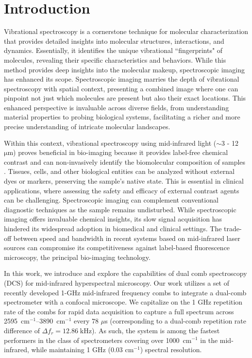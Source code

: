\documentclass[aip,preprint]{revtex4-1}
\begin{document}


\section{Introduction}
Vibrational spectroscopy is a cornerstone technique for molecular characterization that provides detailed insights into molecular structures, interactions, and dynamics. Essentially, it identifies the unique vibrational ``fingerprints" of molecules, revealing their specific characteristics and behaviors. While this method provides deep insights into the molecular makeup, spectroscopic imaging has enhanced its scope. Spectroscopic imaging marries the depth of vibrational spectroscopy with spatial context, presenting a combined image where one can pinpoint not just which molecules are present but also their exact locations. This enhanced perspective is invaluable across diverse fields, from understanding material properties to probing biological systems, facilitating a richer and more precise understanding of intricate molecular landscapes.

Within this context, vibrational spectroscopy using mid-infrared light ($\sim$3 - 12 $\mathrm{\mu m}$) proves beneficial in bio-imaging because it provides label-free chemical contrast and can non-invasively identify the biomolecular composition of samples \cite{bakerUsingFourierTransform2014}. Tissues, cells, and other biological entities can be analyzed without external dyes or markers, preserving the sample's native state. This is essential in clinical applications, where assessing the safety and efficacy of external contrast agents can be challenging. Spectroscopic imaging can complement conventional diagnostic techniques as the sample remains undisturbed. While spectroscopic imaging offers invaluable chemical insights, its slow signal acquisition has hindered its widespread adoption in biomedical and clinical settings. The trade-off between speed and bandwidth in recent systems \cite{zhangDepthresolvedMidinfraredPhotothermal2016,koleDiscreteFrequencyInfrared2012,yehFastInfraredChemical2015}  based on mid-infrared laser sources can compromise its competitiveness against label-based fluorescence microscopy, the principal bio-imaging technology.

In this work, we introduce and explore the capabilities of dual comb spectroscopy (DCS)\cite{coddingtonDualcombSpectroscopy2016} for mid-infrared hyperspectral microscopy.  Our work utilizes a set of recently developed 1-GHz mid-infrared frequency combs \cite{hoghooghiBroadband1GHzMidinfrared2022} to integrate a dual-comb spectrometer with a confocal microscope. We capitalize on the 1 GHz repetition rate of the combs for rapid data acquisition to capture a full spectrum across \mbox{2595 $\mathrm{cm^{-1}}$}--\mbox{3890 $\mathrm{cm^{-1}}$} every 78 $\mu$s (corresponding to a dual-comb repetition rate difference of  \mbox{$\Delta f_r=12.86 \; \text{kHz}$}). As such, the system is among the fastest performers in the class of spectrometers covering over \mbox{1000 $\mathrm{cm^{-1}}$} in the mid-infrared, while maintaining 1 GHz (0.03 cm$^{-1}$) spectral resolution.
\end{document}
